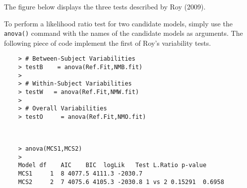 \documentclass[12pt, a4paper]{article}
\theoremstyle{plain}
\theoremstyle{definition}
\theoremstyle{remark}
\begin{document}
The figure below displays the three tests described by Roy (2009).

To perform a likelihood ratio test for two candidate models, simply use the \texttt{anova()} command with the names of the candidate models as arguments. The following piece of code implement the first of Roy's variability tests.

\begin{framed}
	\begin{verbatim}
	> # Between-Subject Variabilities
	> testB    = anova(Ref.Fit,NMB.fit) 
	>         
	> # Within-Subject Variabilities                
	> testW   = anova(Ref.Fit,NMW.fit) 
	>                       
	> # Overall Variabilities
	> testO     = anova(Ref.Fit,NMO.fit)                        
	
	
	\end{verbatim}
\end{framed}



\begin{framed}   
	\begin{verbatim}
	> anova(MCS1,MCS2)
	>
	Model df    AIC    BIC  logLik   Test L.Ratio p-value
	MCS1     1  8 4077.5 4111.3 -2030.7
	MCS2     2  7 4075.6 4105.3 -2030.8 1 vs 2 0.15291  0.6958
	\end{verbatim}
\end{framed}





\end{document}
